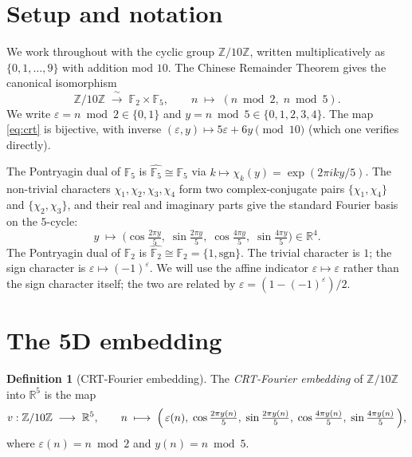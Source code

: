 \documentclass[11pt,reqno]{amsart}
\theoremstyle{definition}
\newtheorem{definition}[theorem]{Definition}
\newcommand{\Z}{\mathbb{Z}}
\newcommand{\R}{\mathbb{R}}
\newcommand{\F}{\mathbb{F}}
\begin{document}
\section{Setup and notation}
\label{sec:setup}

We work throughout with the cyclic group $\Z/10\Z$, written
multiplicatively as $\{0,1,\ldots,9\}$ with addition mod $10$. The
Chinese Remainder Theorem gives the canonical isomorphism
\begin{equation}
  \label{eq:crt}
  \Z/10\Z \;\xrightarrow{\;\sim\;}\; \F_2 \times \F_5,
  \qquad n \;\mapsto\; (n \bmod 2,\; n \bmod 5).
\end{equation}
We write $\varepsilon = n \bmod 2 \in \{0,1\}$ and
$y = n \bmod 5 \in \{0,1,2,3,4\}$. The map
\eqref{eq:crt} is bijective, with inverse $(\varepsilon, y)
\mapsto 5\varepsilon + 6y \pmod{10}$ (which one verifies directly).

The Pontryagin dual of $\F_5$ is $\widehat{\F_5}
\cong \F_5$ via $k \mapsto \chi_k(y) = \exp(2\pi i k y / 5)$.
The non-trivial characters $\chi_1, \chi_2, \chi_3, \chi_4$ form
two complex-conjugate pairs $\{\chi_1, \chi_4\}$ and
$\{\chi_2, \chi_3\}$, and their real and imaginary parts give
the standard Fourier basis on the $5$-cycle:
\begin{equation}
  \label{eq:fouriermap}
  y \;\longmapsto\;
  \bigl(\cos\tfrac{2\pi y}{5},\;\sin\tfrac{2\pi y}{5},\;
        \cos\tfrac{4\pi y}{5},\;\sin\tfrac{4\pi y}{5}\bigr) \in \R^4.
\end{equation}
The Pontryagin dual of $\F_2$ is $\widehat{\F_2} \cong
\F_2 = \{1, \mathrm{sgn}\}$. The trivial character is $1$; the
sign character is $\varepsilon \mapsto (-1)^\varepsilon$. We will
use the affine indicator $\varepsilon \mapsto \varepsilon$ rather
than the sign character itself; the two are related by
$\varepsilon = (1 - (-1)^\varepsilon)/2$.

\section{The 5D embedding}
\label{sec:embedding}

\begin{definition}[CRT-Fourier embedding]
\label{def:embedding}
The \emph{CRT-Fourier embedding} of $\Z/10\Z$ into $\R^5$ is the map
\[
  v : \Z/10\Z \;\longrightarrow\; \R^5,
  \qquad
  n \;\longmapsto\;
  \Bigl(\,\varepsilon(n),\;
  \cos\tfrac{2\pi y(n)}{5},\;\sin\tfrac{2\pi y(n)}{5},\;
  \cos\tfrac{4\pi y(n)}{5},\;\sin\tfrac{4\pi y(n)}{5}\,\Bigr),
\]
where $\varepsilon(n) = n \bmod 2$ and $y(n) = n \bmod 5$.
\end{definition}
\end{document}
